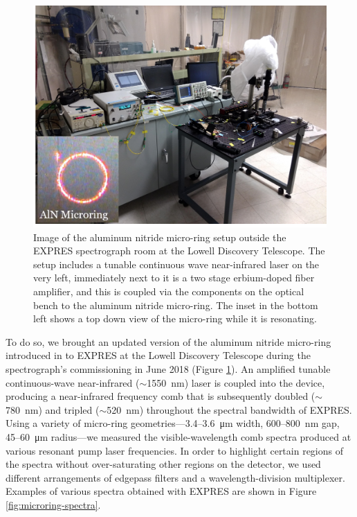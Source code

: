 \begin{figure}
    \centering
    \includegraphics[width=\textwidth]{figures-3/microring-setup.png}
    \caption[Aluminum nitride micro-ring at the Lowell Discovery Telescope]{Image of the aluminum nitride micro-ring setup outside the EXPRES spectrograph room at the Lowell Discovery Telescope. The setup includes a tunable continuous wave near-infrared laser on the very left, immediately next to it is a two stage erbium-doped fiber amplifier, and this is coupled via the components on the optical bench to the aluminum nitride micro-ring. The inset in the bottom left shows a top down view of the micro-ring while it is resonating.}
    \label{fig:microring-setup}
\end{figure}

To do so, we brought an updated version of the aluminum nitride micro-ring introduced in \citet{jung_green_2014} to EXPRES at the Lowell Discovery Telescope during the spectrograph's commissioning in June 2018 (Figure \ref{fig:microring-setup}). An amplified tunable continuous-wave near-infrared ($\sim$1550~\si{\nano\meter}) laser is coupled into the device, producing a near-infrared frequency comb that is subsequently doubled ($\sim$780~\si{\nano\meter}) and tripled ($\sim$520~\si{\nano\meter}) throughout the spectral bandwidth of EXPRES. Using a variety of micro-ring geometries---3.4--3.6~\si{\micro\meter} width, 600--800~\si{\nano\meter} gap, 45--60~\si{\micro\meter} radius---we measured the visible-wavelength comb spectra produced at various resonant pump laser frequencies. In order to highlight certain regions of the spectra without over-saturating other regions on the detector, we used different arrangements of edgepass filters and a wavelength-division multiplexer. Examples of various spectra obtained with EXPRES are shown in Figure \ref{fig:microring-spectra}.

